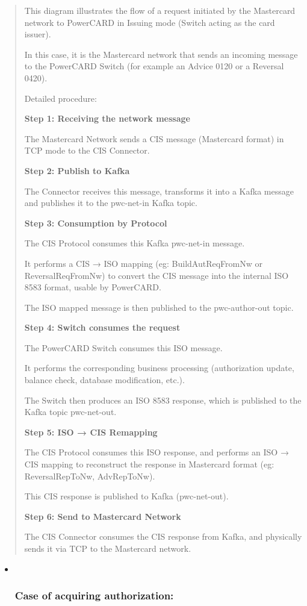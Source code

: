\documentclass[12pt,a4paper]{report}
\begin{document}
\begin{quote}
This diagram illustrates the flow of a request initiated by the
Mastercard network to PowerCARD in Issuing mode (Switch acting as the
card issuer).

In this case, it is the Mastercard network that sends an incoming
message to the PowerCARD Switch (for example an Advice 0120 or a
Reversal 0420).

Detailed procedure:

\textbf{Step 1: Receiving the network message}

The Mastercard Network sends a CIS message (Mastercard format) in TCP
mode to the CIS Connector.

\textbf{Step 2: Publish to Kafka}

The Connector receives this message, transforms it into a Kafka message
and publishes it to the pwc-net-in Kafka topic.

\textbf{Step 3: Consumption by Protocol}

The CIS Protocol consumes this Kafka pwc-net-in message.

It performs a CIS → ISO mapping (eg: BuildAutReqFromNw or
ReversalReqFromNw) to convert the CIS message into the internal ISO 8583
format, usable by PowerCARD.

The ISO mapped message is then published to the pwc-author-out topic.

\textbf{Step 4: Switch consumes the request}

The PowerCARD Switch consumes this ISO message.

It performs the corresponding business processing (authorization update,
balance check, database modification, etc.).

The Switch then produces an ISO 8583 response, which is published to the
Kafka topic pwc-net-out.

\textbf{Step 5: ISO → CIS Remapping}

The CIS Protocol consumes this ISO response, and performs an ISO → CIS
mapping to reconstruct the response in Mastercard format (eg:
ReversalRepToNw, AdvRepToNw).

This CIS response is published to Kafka (pwc-net-out).

\textbf{Step 6: Send to Mastercard Network}

The CIS Connector consumes the CIS response from Kafka, and physically
sends it via TCP to the Mastercard network.
\end{quote}

\begin{itemize}
\item ~
  \hypertarget{case-of-acquiring-authorization}{%
  \subsubsection{\texorpdfstring{\textbf{Case of acquiring
  authorization:}}{Case of acquiring authorization:}}\label{case-of-acquiring-authorization}}
\end{itemize}
\end{document}
